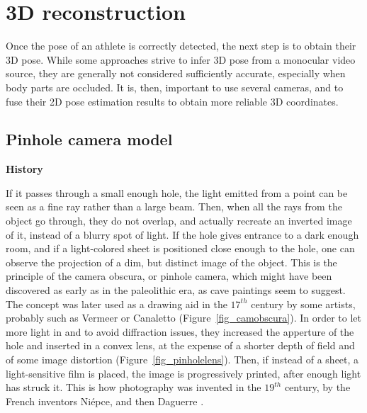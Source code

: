 \FloatBarrier
\section{3D reconstruction}\label{sec:3D reconstruction}
\label{ch:2.2}

Once the pose of an athlete is correctly detected, the next step is to obtain their 3D pose. While some approaches strive to infer 3D pose from a monocular video source, they are generally not considered sufficiently accurate, especially when body parts are occluded. It is, then, important to use several cameras, and to fuse their 2D pose estimation results to obtain more reliable 3D coordinates.


\subsection{Pinhole camera model}\label{subsec:Pinhole model}

\noindent\textbf{History}

If it passes through a small enough hole, the light emitted from a point can be seen as a fine ray rather than a large beam. Then, when all the rays from the object go through, they do not overlap, and actually recreate an inverted image of it, instead of a blurry spot of light. If the hole gives entrance to a dark enough room, and if a light-colored sheet is positioned close enough to the hole, one can observe the projection of a dim, but distinct image of the object. This is the principle of the camera obscura, or pinhole camera, which might have been discovered as early as in the paleolithic era, as cave paintings seem to suggest. The concept was later used as a drawing aid in the $17^{th}$ century by some artists, probably such as Vermeer or Canaletto \cite{Steadman2001} (Figure~\ref{fig_camobscura}). In order to let more light in and to avoid diffraction issues, they increased the apperture of the hole and inserted in a convex lens, at the expense of a shorter depth of field and of some image distortion (Figure~\ref{fig_pinholelens}). Then, if instead of a sheet, a light-sensitive film is placed, the image is progressively printed, after enough light has struck it. This is how photography was invented in the $19^{th}$ century, by the French inventors Niépce, and then Daguerre \cite{Marignier1999}.

